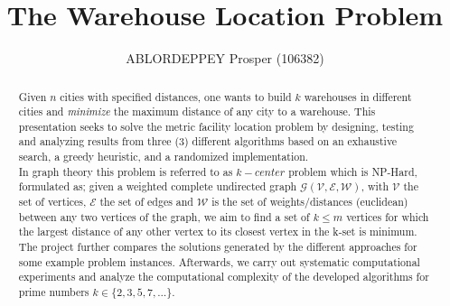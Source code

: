 \documentclass[longpaper, english, final, times]{revdetua}
\begin{document}
	
	
	\title{The Warehouse Location Problem}
	\author{ABLORDEPPEY Prosper (106382)} %
	\maketitle
	
	\begin{abstract}%
%		
		Given $n$ cities with specified distances, one wants to build $k$ warehouses in different cities and \textit{minimize} the maximum distance of any city to a warehouse. This presentation seeks to solve the metric facility location problem by designing, testing and analyzing results from three (3) different algorithms based on an exhaustive search, a greedy heuristic, and a randomized implementation.\\
		
		In graph theory this problem is referred to as $k-center$ problem which is NP-Hard, formulated as; 
		given a weighted complete undirected graph $\mathcal{G(V, E, W)}$, with $\mathcal{V}$ the set of vertices, $\mathcal{E}$ the set of edges and $\mathcal{W}$ is the set of weights/distances (euclidean) between any two vertices of the graph, we aim to find a set of $k \leq m$ vertices for which the largest distance of any other vertex to its closest vertex in the k-set is minimum.\\
		
		The project further compares the solutions generated by the different approaches for some example problem instances. Afterwards, we carry out systematic computational experiments and analyze the computational complexity of the developed algorithms for prime numbers $k \in \{2,3,5,7,\dots\}$.
	\end{abstract}
%
%	
	
\end{document}

